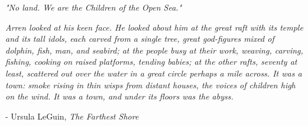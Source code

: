 \documentclass[10pt]{article}
\begin{document}
\begin{textblock}{11}
\textit{"No land. We are the Children of the Open Sea."}

\textit{Arren looked at his keen face. He looked about him at the great raft
with its temple and its tall idols, each carved from a single tree, great
god-figures mixed of dolphin, fish, man, and seabird; at the people busy at
their work, weaving, carving, fishing, cooking on raised platforms, tending
babies; at the other rafts, seventy at least, scattered out over the water in a
great circle perhaps a mile across. It was a town: smoke rising in thin wisps
from distant houses, the voices of children high on the wind. It was a town,
and under its floors was the abyss.}

- Ursula LeGuin, \emph{The Farthest Shore}

\end{textblock}
\end{document}
